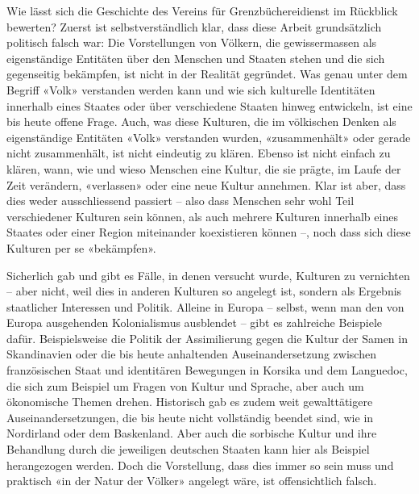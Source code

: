 \documentclass[a4paper,
fontsize=11pt,
oneside,
numbers=noperiodatend,
parskip=half-,
bibliography=totoc,
final
]{scrartcl}
\begin{document}
Wie lässt sich die Geschichte des Vereins für Grenzbüchereidienst im
Rückblick bewerten? Zuerst ist selbstverständlich klar, dass diese
Arbeit grundsätzlich politisch falsch war: Die Vorstellungen von
Völkern, die gewissermassen als eigenständige Entitäten über den
Menschen und Staaten stehen und die sich gegenseitig bekämpfen, ist
nicht in der Realität gegründet. Was genau unter dem Begriff «Volk»
verstanden werden kann und wie sich kulturelle Identitäten innerhalb
eines Staates oder über verschiedene Staaten hinweg entwickeln, ist eine
bis heute offene Frage. Auch, was diese Kulturen, die im völkischen
Denken als eigenständige Entitäten «Volk» verstanden wurden,
«zusammenhält» oder gerade nicht zusammenhält, ist nicht eindeutig zu
klären. Ebenso ist nicht einfach zu klären, wann, wie und wieso Menschen
eine Kultur, die sie prägte, im Laufe der Zeit verändern, «verlassen»
oder eine neue Kultur annehmen. Klar ist aber, dass dies weder
ausschliessend passiert -- also dass Menschen sehr wohl Teil
verschiedener Kulturen sein können, als auch mehrere Kulturen innerhalb
eines Staates oder einer Region miteinander koexistieren können --, noch
dass sich diese Kulturen per se «bekämpfen».

Sicherlich gab und gibt es Fälle, in denen versucht wurde, Kulturen zu
vernichten -- aber nicht, weil dies in anderen Kulturen so angelegt ist,
sondern als Ergebnis staatlicher Interessen und Politik. Alleine in
Europa -- selbst, wenn man den von Europa ausgehenden Kolonialismus
ausblendet -- gibt es zahlreiche Beispiele dafür. Beispielsweise die
Politik der Assimilierung gegen die Kultur der Samen in Skandinavien
oder die bis heute anhaltenden Auseinandersetzung zwischen französischen
Staat und identitären Bewegungen in Korsika und dem Languedoc, die sich
zum Beispiel um Fragen von Kultur und Sprache, aber auch um ökonomische
Themen drehen. Historisch gab es zudem weit gewalttätigere
Auseinandersetzungen, die bis heute nicht vollständig beendet sind, wie
in Nordirland oder dem Baskenland. Aber auch die sorbische Kultur und
ihre Behandlung durch die jeweiligen deutschen Staaten kann hier als
Beispiel herangezogen werden. Doch die Vorstellung, dass dies immer so
sein muss und praktisch «in der Natur der Völker» angelegt wäre, ist
offensichtlich falsch.
\end{document}
